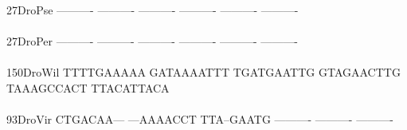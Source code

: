\documentclass[11pt,twoside,reqno,a4paper]{article}
\begin{document}
{27\hspace*{3\charwidth}DroPse	----------	----------	----------	----------	----------	----------	\\
\hspace*{5\charwidth}\hspace*{7\charwidth}\hspace*{1\charwidth}\hspace*{1\charwidth}\hspace*{1\charwidth}\hspace*{1\charwidth}\hspace*{1\charwidth}\hspace*{1\charwidth}\\
27\hspace*{3\charwidth}DroPer	----------	----------	----------	----------	----------	----------	\\
\hspace*{5\charwidth}\hspace*{7\charwidth}\hspace*{1\charwidth}\hspace*{1\charwidth}\hspace*{1\charwidth}\hspace*{1\charwidth}\hspace*{1\charwidth}\hspace*{1\charwidth}\\
150\hspace*{2\charwidth}DroWil	TTTTGAAAAA	GATAAAATTT	TGATGAATTG	GTAGAACTTG	TAAAGCCACT	TTACATTACA	\\
\hspace*{5\charwidth}\hspace*{7\charwidth}\hspace*{1\charwidth}\hspace*{1\charwidth}\hspace*{1\charwidth}\hspace*{1\charwidth}\hspace*{1\charwidth}\hspace*{1\charwidth}\\
93\hspace*{3\charwidth}DroVir	CTGACAA---	---AAAACCT	TTA--GAATG	----------	----------	----------	\\
\hspace*{5\charwidth}\hspace*{7\charwidth}\hspace*{1\charwidth}\hspace*{1\charwidth}\hspace*{1\charwidth}\hspace*{1\charwidth}\hspace*{1\charwidth}\hspace*{1\charwidth}\\
}
\end{document}
